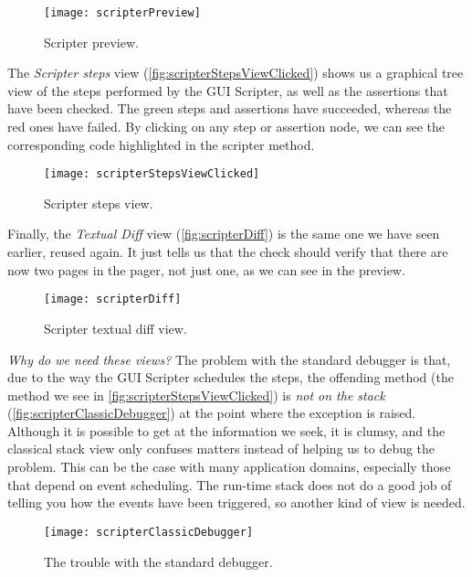 \documentclass[sigplan,anonymous,review,10pt]{acmart}
\begin{document}
\begin{figure}[h]
  \texttt{[image: scripterPreview]}
  \caption{Scripter preview.}
  \label{fig:scripterPreview}
\end{figure}

The \emph{Scripter steps} view (\autoref{fig:scripterStepsViewClicked}) shows us a graphical tree view of the steps performed by the GUI Scripter, as well as the assertions that have been checked.
The green steps and assertions have succeeded, whereas the red ones have failed.
By clicking on any step or assertion node, we can see the corresponding code highlighted in the scripter method.

\begin{figure}[h]
  \texttt{[image: scripterStepsViewClicked]}
  \caption{Scripter steps view.}
  \label{fig:scripterStepsViewClicked}
\end{figure}

Finally, the \emph{Textual Diff} view (\autoref{fig:scripterDiff}) is the same one we have seen earlier, reused again.
It just tells us that the check should verify that there are now two pages in the pager, not just one, as we can see in the preview.

\begin{figure}[h]
  \texttt{[image: scripterDiff]}
  \caption{Scripter textual diff view.}
  \label{fig:scripterDiff}
\end{figure}

\emph{Why do we need these views?}
The problem with the standard debugger is that, due to the way the GUI Scripter schedules the steps, the offending method (\ie the  method we see in \autoref{fig:scripterStepsViewClicked}) is \emph{not on the stack} (\autoref{fig:scripterClassicDebugger}) at the point where the exception is raised.
Although it is possible to get at the information we seek, it is clumsy, and the classical stack view only confuses matters instead of helping us to debug the problem.
This can be the case with many application domains, especially those that depend on event scheduling.
The run-time stack does not do a good job of telling you how the events have been triggered, so another kind of view is needed.

\begin{figure}[h]
  \texttt{[image: scripterClassicDebugger]}
  \caption{The trouble with the standard debugger.}
  \label{fig:scripterClassicDebugger}
\end{figure}
\end{document}
